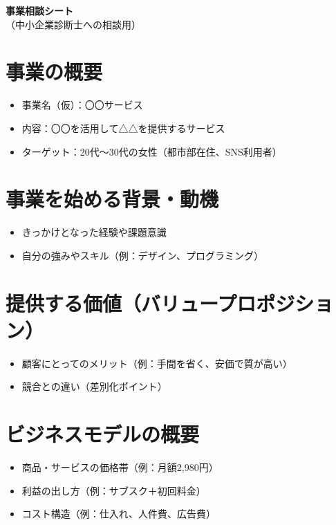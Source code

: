 \documentclass[a4paper,12pt]{article}
\begin{document}
\begin{center}
    {\LARGE \bf 事業相談シート} \\
    \vspace{2mm}
    （中小企業診断士への相談用）
\end{center}

\vspace{5mm}

\section{事業の概要}
\begin{itemize}[leftmargin=1.5em]
  \item 事業名（仮）：〇〇サービス
  \item 内容：〇〇を活用して△△を提供するサービス
  \item ターゲット：20代〜30代の女性（都市部在住、SNS利用者）
\end{itemize}

\section{事業を始める背景・動機}
\begin{itemize}[leftmargin=1.5em]
  \item きっかけとなった経験や課題意識 %
  \item 自分の強みやスキル（例：デザイン、プログラミング） %
\end{itemize}

\section{提供する価値（バリュープロポジション）}
\begin{itemize}[leftmargin=1.5em]
  \item 顧客にとってのメリット（例：手間を省く、安価で質が高い）
  \item 競合との違い（差別化ポイント）
\end{itemize}

\section{ビジネスモデルの概要}
\begin{itemize}[leftmargin=1.5em]
  \item 商品・サービスの価格帯（例：月額2,980円）
  \item 利益の出し方（例：サブスク＋初回料金）
  \item コスト構造（例：仕入れ、人件費、広告費）
\end{itemize}
\end{document}
